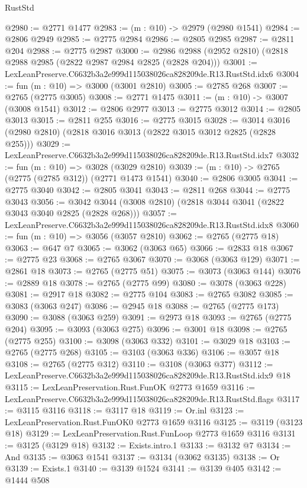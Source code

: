 \begin{lexlean}{RustStd}
\begin{coremodule}
@2980 := @2771 @1477
@2983 := (m : @10) -> @2979 (@2980 @1541)
@2984 := @2806 @2949
@2985 := @2775 @2984
@2986 := @2805 @2985
@2987 := @2811 @204
@2988 := @2775 @2987
@3000 := @2986 @2988 (@2952 @2810) (@2818 @2988 @2985 (@2822 @2987 @2984 @2825 (@2828 @204)))
@3001 := LexLeanPreserve.C6632b3a2e999d115038026ca828209de.R13.RustStd.idx6
@3004 := fun (m : @10) => @3000 (@3001 @2810)
@3005 := @2785 @268
@3007 := @2765 (@2775 @3005)
@3008 := @2771 @1475
@3011 := (m : @10) -> @3007 (@3008 @1541)
@3012 := @2806 @2977
@3013 := @2775 @3012
@3014 := @2805 @3013
@3015 := @2811 @255
@3016 := @2775 @3015
@3028 := @3014 @3016 (@2980 @2810) (@2818 @3016 @3013 (@2822 @3015 @3012 @2825 (@2828 @255)))
@3029 := LexLeanPreserve.C6632b3a2e999d115038026ca828209de.R13.RustStd.idx7
@3032 := fun (m : @10) => @3028 (@3029 @2810)
@3039 := (m : @10) -> @2765 (@2775 (@2785 @312)) (@2771 @1473 @1541)
@3040 := @2806 @3005
@3041 := @2775 @3040
@3042 := @2805 @3041
@3043 := @2811 @268
@3044 := @2775 @3043
@3056 := @3042 @3044 (@3008 @2810) (@2818 @3044 @3041 (@2822 @3043 @3040 @2825 (@2828 @268)))
@3057 := LexLeanPreserve.C6632b3a2e999d115038026ca828209de.R13.RustStd.idx8
@3060 := fun (m : @10) => @3056 (@3057 @2810)
@3062 := @2765 (@2775 @18)
@3063 := @647 @7
@3065 := @3062 (@3063 @65)
@3066 := @2833 @18
@3067 := @2775 @23
@3068 := @2765 @3067
@3070 := @3068 (@3063 @129)
@3071 := @2861 @18
@3073 := @2765 (@2775 @51)
@3075 := @3073 (@3063 @144)
@3076 := @2889 @18
@3078 := @2765 (@2775 @99)
@3080 := @3078 (@3063 @228)
@3081 := @2917 @18
@3082 := @2775 @104
@3083 := @2765 @3082
@3085 := @3083 (@3063 @247)
@3086 := @2945 @18
@3088 := @2765 (@2775 @173)
@3090 := @3088 (@3063 @259)
@3091 := @2973 @18
@3093 := @2765 (@2775 @204)
@3095 := @3093 (@3063 @275)
@3096 := @3001 @18
@3098 := @2765 (@2775 @255)
@3100 := @3098 (@3063 @332)
@3101 := @3029 @18
@3103 := @2765 (@2775 @268)
@3105 := @3103 (@3063 @336)
@3106 := @3057 @18
@3108 := @2765 (@2775 @312)
@3110 := @3108 (@3063 @377)
@3112 := LexLeanPreserve.C6632b3a2e999d115038026ca828209de.R13.RustStd.idx9 @18
@3115 := LexLeanPreservation.Rust.FunOK @2773 @1659
@3116 := LexLeanPreserve.C6632b3a2e999d115038026ca828209de.R13.RustStd.flags
@3117 := @3115 @3116
@3118 := @3117 @18
@3119 := Or.inl
@3123 := LexLeanPreservation.Rust.FunOK0 @2773 @1659 @3116
@3125 := @3119 (@3123 @18)
@3129 := LexLeanPreservation.Rust.FunLoop @2773 @1659 @3116
@3131 := @3125 (@3129 @18)
@3132 := Exists.intro.{1}
@3133 := @3132 @7
@3134 := And
@3135 := @3063 @1541
@3137 := @3134 (@3062 @3135)
@3138 := Or
@3139 := Exists.{1}
@3140 := @3139 @1524
@3141 := @3139 @405
@3142 := @1444 @508

\end{coremodule}
\end{lexlean}
